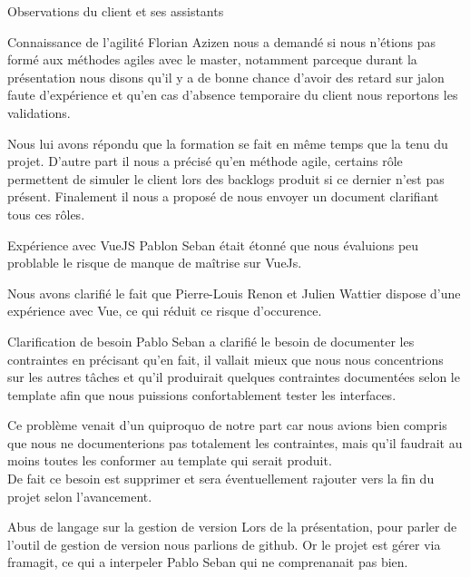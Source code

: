 \documentclass[]{article}
\begin{document}
    \begin{section}{Observations du client et ses assistants}
        \begin{subsection}{Connaissance de l'agilité}
            Florian Azizen nous a demandé si nous n'étions pas formé aux méthodes agiles avec le master, notamment parceque 
            durant la présentation nous disons qu'il y a de bonne chance d'avoir des retard sur jalon faute d'expérience et 
            qu'en cas d'absence temporaire du client nous reportons les validations.

            Nous lui avons répondu que la formation se fait en même temps que la tenu du projet. D'autre part il nous a précisé 
            qu'en méthode agile, certains rôle permettent de simuler le client lors des backlogs produit si ce dernier n'est pas 
            présent. Finalement il nous a proposé de nous envoyer un document clarifiant tous ces rôles.
        \end{subsection}
        
        \begin{subsection}{Expérience avec VueJS}
            Pablon Seban était étonné que nous évaluions peu problable le risque de manque de maîtrise sur VueJs.

            Nous avons clarifié le fait que Pierre-Louis Renon et Julien Wattier dispose d'une expérience avec Vue, ce qui 
            réduit ce risque d'occurence.
        \end{subsection}

        \begin{subsection}{Clarification de besoin}
            Pablo Seban a clarifié le besoin de documenter les contraintes en précisant qu'en fait, il vallait mieux que nous 
            nous concentrions sur les autres tâches et qu'il produirait quelques contraintes documentées selon le template afin 
            que nous puissions confortablement tester les interfaces.

            Ce problème venait d'un quiproquo de notre part car nous avions bien compris que nous ne documenterions pas 
            totalement les contraintes, mais qu'il faudrait au moins toutes les conformer au template qui serait produit.\\
            De fait ce besoin est supprimer et sera éventuellement rajouter vers la fin du projet selon l'avancement.
        \end{subsection}

        \begin{subsection}{Abus de langage sur la gestion de version}
            Lors de la présentation, pour parler de l'outil de gestion de version nous parlions de github. Or le projet est 
            gérer via framagit, ce qui a interpeler Pablo Seban qui ne comprenanait pas bien.


\end{subsection}
\end{section}
\end{document}
